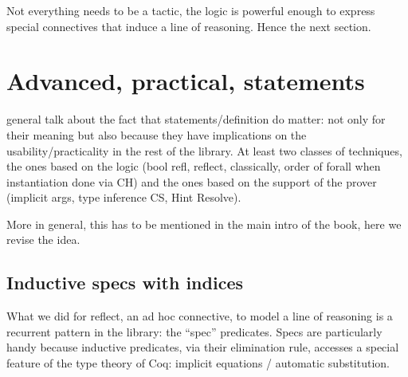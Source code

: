










Not everything needs to be a tactic, the logic is powerful
enough to express special connectives that induce a line of
reasoning. Hence the next section.

\section{Advanced, practical, statements}

general talk about the fact that statements/definition do matter: not only for
their meaning but also because they have implications on the
usability/practicality in the rest of the library.  At least two classes of
techniques, the ones based on the logic (bool refl, reflect, classically, order
of forall when instantiation done via CH) and the ones based on the support of
the prover (implicit args, type inference CS, Hint Resolve).

More in general, this has to be mentioned in the main intro of the book, here
we revise the idea.

\subsection{Inductive specs with indices}\label{ssec:specs}
What we did for reflect, an ad hoc connective, to model a line of reasoning is
a recurrent pattern in the \mcbMC{} library: the ``spec'' predicates.  Specs
are particularly handy  because inductive predicates, via their elimination
rule, accesses a special feature of the type theory of Coq: implicit equations
/ automatic substitution.

